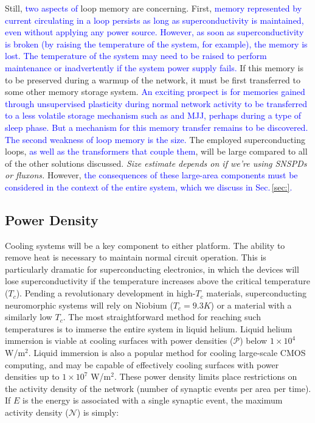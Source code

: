 \documentclass[twocolumn]{article}
\begin{document}
Still, \textcolor{blue}{two aspects of} loop memory are concerning. First, \textcolor{blue}{memory represented by current circulating in a loop persists as long as superconductivity is maintained, even without applying any power source. However, as soon as superconductivity is broken (by raising the temperature of the system, for example), the memory is lost. The temperature of the system may need to be raised to perform maintenance or inadvertently if the system power supply fails.} If this memory is to be preserved during a warmup of the network, it must be first transferred to some other memory storage system. \textcolor{blue}{An exciting prospect is for memories gained through unsupervised plasticity during normal network activity to be transferred to a less volatile storage mechanism such as and MJJ, perhaps during a type of sleep phase. But a mechanism for this memory transfer remains to be discovered. The second weakness of loop memory is the size.} The employed superconducting loops, \textcolor{blue}{as well as the transformers that couple them}, will be large compared to all of the other solutions discussed. \textit{Size estimate depends on if we're using SNSPDs or fluxons.} However, \textcolor{blue}{the consequences of these large-area components must be considered in the context of the entire system, which we discuss in Sec.\,\ref{sec:}.} 



\subsection{Power Density}
Cooling systems will be a key component to either platform. The ability to remove heat is necessary to maintain normal circuit operation. This is particularly dramatic for superconducting electronics, in which the devices will lose superconductivity if the temperature increases above the critical temperature ($T_c$). Pending a revolutionary development in high-$T_c$ materials, superconducting neuromorphic systems will rely on Niobium ($T_c = 9.3K$) or a material with a similarly low $T_c$. The most straightforward method for reaching such temperatures is to immerse the entire system in liquid helium. Liquid helium immersion is viable at cooling surfaces with power densities ($\mathcal{P}$) below $1 \times 10^4$ W/m$^2$. Liquid immersion is also a popular method for cooling large-scale CMOS computing, and may be capable of effectively cooling surfaces with power densities up to $1 \times 10^7$ W/m$^2$. These power density limits place restrictions on the activity density of the network (number of synaptic events per area per time). If $E$ is the energy is associated with a single synaptic event, the maximum activity density ($\mathcal{N}$) is simply:
\end{document}

